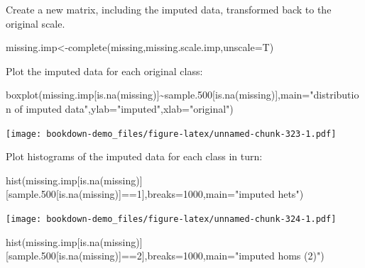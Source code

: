 \documentclass[
]{book}
\newenvironment{Shaded}{\begin{snugshade}}{\end{snugshade}}
\newcommand{\AttributeTok}[1]{\textcolor[rgb]{0.77,0.63,0.00}{#1}}
\newcommand{\DecValTok}[1]{\textcolor[rgb]{0.00,0.00,0.81}{#1}}
\newcommand{\FloatTok}[1]{\textcolor[rgb]{0.00,0.00,0.81}{#1}}
\newcommand{\FunctionTok}[1]{\textcolor[rgb]{0.00,0.00,0.00}{#1}}
\newcommand{\NormalTok}[1]{#1}
\newcommand{\OtherTok}[1]{\textcolor[rgb]{0.56,0.35,0.01}{#1}}
\newcommand{\SpecialCharTok}[1]{\textcolor[rgb]{0.00,0.00,0.00}{#1}}
\newcommand{\StringTok}[1]{\textcolor[rgb]{0.31,0.60,0.02}{#1}}
\begin{document}
Create a new matrix, including the imputed data, transformed back to the original scale.

\begin{Shaded}
\begin{Highlighting}[]
\NormalTok{missing.imp}\OtherTok{\textless{}{-}}\FunctionTok{complete}\NormalTok{(missing,missing.scale.imp,}\AttributeTok{unscale=}\NormalTok{T)}
\end{Highlighting}
\end{Shaded}

Plot the imputed data for each original class:

\begin{Shaded}
\begin{Highlighting}[]
\FunctionTok{boxplot}\NormalTok{(missing.imp[}\FunctionTok{is.na}\NormalTok{(missing)]}\SpecialCharTok{\textasciitilde{}}\NormalTok{sample}\FloatTok{.500}\NormalTok{[}\FunctionTok{is.na}\NormalTok{(missing)],}\AttributeTok{main=}\StringTok{"distribution of imputed data"}\NormalTok{,}\AttributeTok{ylab=}\StringTok{"imputed"}\NormalTok{,}\AttributeTok{xlab=}\StringTok{"original"}\NormalTok{)}
\end{Highlighting}
\end{Shaded}

\texttt{[image: bookdown-demo\_files/figure-latex/unnamed-chunk-323-1.pdf]}

Plot histograms of the imputed data for each class in turn:

\begin{Shaded}
\begin{Highlighting}[]
\FunctionTok{hist}\NormalTok{(missing.imp[}\FunctionTok{is.na}\NormalTok{(missing)][sample}\FloatTok{.500}\NormalTok{[}\FunctionTok{is.na}\NormalTok{(missing)]}\SpecialCharTok{==}\DecValTok{1}\NormalTok{],}\AttributeTok{breaks=}\DecValTok{1000}\NormalTok{,}\AttributeTok{main=}\StringTok{"imputed hets"}\NormalTok{)}
\end{Highlighting}
\end{Shaded}

\texttt{[image: bookdown-demo\_files/figure-latex/unnamed-chunk-324-1.pdf]}

\begin{Shaded}
\begin{Highlighting}[]
\FunctionTok{hist}\NormalTok{(missing.imp[}\FunctionTok{is.na}\NormalTok{(missing)][sample}\FloatTok{.500}\NormalTok{[}\FunctionTok{is.na}\NormalTok{(missing)]}\SpecialCharTok{==}\DecValTok{2}\NormalTok{],}\AttributeTok{breaks=}\DecValTok{1000}\NormalTok{,}\AttributeTok{main=}\StringTok{"imputed homs (2)"}\NormalTok{)}
\end{Highlighting}
\end{Shaded}
\end{document}
